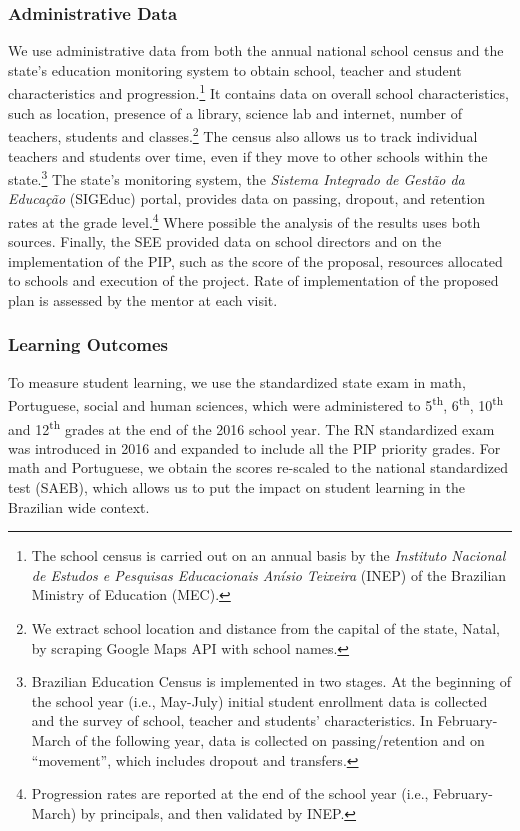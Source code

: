 \documentclass[11pt,a4paper]{article}
\begin{document}
	\subsubsection*{Administrative Data} 
	We use administrative data from both the annual national school census and the state's education monitoring system to obtain school, teacher and student characteristics and progression.\footnote{The school census is carried out on an annual basis by the \textit{Instituto Nacional de Estudos e Pesquisas Educacionais Anísio Teixeira} (INEP) of the Brazilian Ministry of Education (MEC).} It contains data on overall school characteristics, such as location, presence of a library, science lab and internet, number of teachers, students and classes.\footnote{We extract school location and distance from the capital of the state, Natal, by scraping Google Maps API with school names.} The census also allows us to track individual teachers and students over time, even if they move to other schools within the state.\footnote{Brazilian Education Census is implemented in two stages. At the beginning of the school year (i.e., May-July) initial student enrollment data is collected and the survey of school, teacher and students' characteristics. In February-March of the following year, data is collected on passing/retention and on ``movement'', which includes dropout and transfers.} The state's monitoring system, the \textit{Sistema Integrado de Gestão da Educação} (SIGEduc) portal, provides data on passing, dropout, and retention rates at the grade level.\footnote{Progression rates are reported at the end of the school year (i.e., February-March) by principals, and then validated by INEP.} Where possible the analysis of the results uses both sources. Finally, the SEE provided data on school directors and on the implementation of the PIP, such as the score of the proposal, resources allocated to schools and execution of the project. Rate of implementation of the proposed plan is assessed by the mentor at each visit.  
	
	\subsubsection*{Learning Outcomes}
	To measure student learning, we use the standardized state exam in math, Portuguese, social and human sciences, which were administered to 5\textsuperscript{th}, 6\textsuperscript{th}, 10\textsuperscript{th} and 12\textsuperscript{th} grades at the end of the 2016 school year. The RN standardized exam was introduced in 2016 and expanded to include all the PIP priority grades. For math and Portuguese, we obtain the scores re-scaled to the national standardized test (SAEB), which allows us to put the impact on student learning in the Brazilian wide context. 
	
\end{document}
